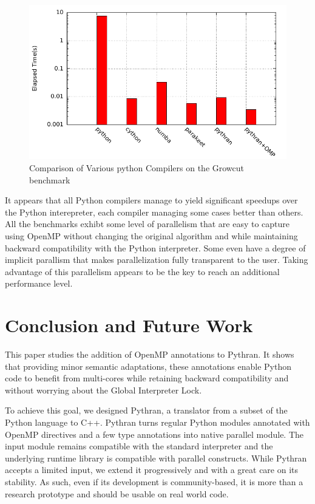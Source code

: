 \documentclass[conference]{IEEEtran}
\begin{document}
\begin{figure}[ht]
    \includegraphics[width=.5\textwidth]{growcut}
    \caption{Comparison of Various python Compilers on the Growcut benchmark}
    \label{fig:pb-growcut}
\end{figure}

It appears that all Python compilers manage to yield significant speedups over
the Python interepreter, each compiler managing some cases better than others.
All the benchmarks exhibt some level of parallelism that are easy to capture
using OpenMP without changing the original algorithm and while maintaining
backward compatibility with the Python interpreter. Some even have a degree of
implicit parallism that makes parallelization fully transparent to the user.
Taking advantage of this parallelism appears to be the key to reach an
additional performance level.


\section{Conclusion and Future Work}

This paper studies the addition of OpenMP annotations to Pythran. It shows that
providing minor semantic adaptations, these annotations enable Python code
to benefit from multi-cores while retaining backward compatibility and without
worrying about the Global Interpreter Lock.

To achieve this goal, we designed Pythran, a translator from a subset of the
Python language to C++. Pythran turns regular Python modules annotated with
OpenMP directives and a few type annotations into native parallel module. The
input module remains compatible with the standard interpreter and the underlying
runtime library is compatible with parallel constructs. While Pythran accepts a
limited input, we extend it progressively and with a great care on its
stability. As such, even if its development is community-based, it is more than
a research prototype and should be usable on real world code.
\end{document}
